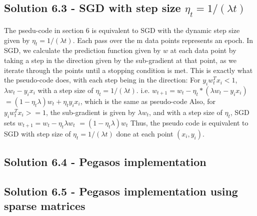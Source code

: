 \documentclass{article}
\begin{document}
    \subsection{Solution 6.3 - SGD with step size $\eta_{t}=1/\left(\lambda t\right)$}
    The psedu-code in section 6 is equivalent to SGD with the dynamic step size given by $\eta_{t}=1/\left(\lambda t\right)$. Each pass over the m data points represents an epoch. In SGD, we calculate the prediction function given by $w$ at each data point by taking a step in the direction given by the sub-gradient at that point, as we iterate through the points until a stopping condition is met. This is exactly what the pseudo-code does, with each step being in the direction:
    \newline
    \newline
    For $y_{i}w_{t}^{T}x_{i} < 1$,
    \newline
    $\lambda w_{t} - y_{i}x_{i}$ with a step size of $\eta_{t}=1/\left(\lambda t\right)$. i.e.
    \newline
    $w_{t+1} = w_{t} - \eta_{t} * (\lambda w_{t} - y_{i}x_{i})$
    \newline
    $= (1-\eta_{t} \lambda) w_{t} + \eta_{t}y_{i}x_{i}$, which is the same as pseudo-code
    \newline
    \newline
    Also, for $y_{i}w_{t}^{T}x_{i} >= 1$,
    the sub-gradient is given by $\lambda w_{t}$, and with a step size of $\eta_{t}$,
    SGD sets $w_{t+1} = w_{t} - \eta_{t} \lambda w_{t}$
    \newline
    $= (1-\eta_{t} \lambda)w_{t}$
    \newline
    \newline
    Thus, the pseudo code is equivalent to SGD with step size of $\eta_{t}=1/\left(\lambda t\right)$ done at each point $(x_{i}, y_{i})$.
    
    \subsection{Solution 6.4 - Pegasos implementation}
    
    
    \subsection{Solution 6.5 - Pegasos implementation using sparse matrices}
    
    
\end{document}
